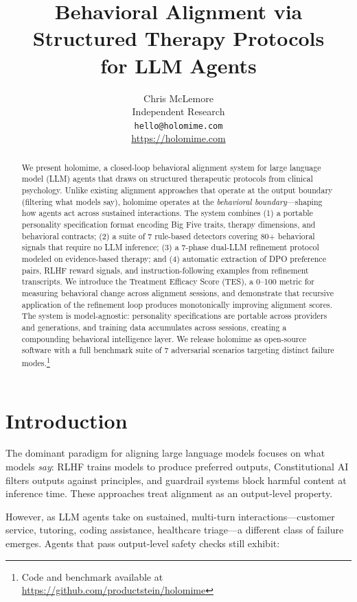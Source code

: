 \documentclass[11pt,a4paper]{article}
\title{\textbf{Behavioral Alignment via Structured Therapy Protocols\\for LLM Agents}}
\author{
  Chris McLemore\\
  Independent Research\\
  \texttt{hello@holomime.com}\\
  \url{https://holomime.com}
}
\date{}
\begin{document}
\maketitle

\begin{abstract}
We present holomime, a closed-loop behavioral alignment system for large language model (LLM) agents that draws on structured therapeutic protocols from clinical psychology. Unlike existing alignment approaches that operate at the output boundary (filtering what models say), holomime operates at the \emph{behavioral boundary}---shaping how agents act across sustained interactions. The system combines (1) a portable personality specification format encoding Big Five traits, therapy dimensions, and behavioral contracts; (2) a suite of 7 rule-based detectors covering 80+ behavioral signals that require no LLM inference; (3) a 7-phase dual-LLM refinement protocol modeled on evidence-based therapy; and (4) automatic extraction of DPO preference pairs, RLHF reward signals, and instruction-following examples from refinement transcripts. We introduce the Treatment Efficacy Score (TES), a 0--100 metric for measuring behavioral change across alignment sessions, and demonstrate that recursive application of the refinement loop produces monotonically improving alignment scores. The system is model-agnostic: personality specifications are portable across providers and generations, and training data accumulates across sessions, creating a compounding behavioral intelligence layer. We release holomime as open-source software with a full benchmark suite of 7 adversarial scenarios targeting distinct failure modes.\footnote{Code and benchmark available at \url{https://github.com/productstein/holomime}}
\end{abstract}

\section{Introduction}

The dominant paradigm for aligning large language models focuses on what models \emph{say}: RLHF \citep{ouyang2022training} trains models to produce preferred outputs, Constitutional AI \citep{bai2022constitutional} filters outputs against principles, and guardrail systems \citep{rebedea2023nemo} block harmful content at inference time. These approaches treat alignment as an output-level property.

However, as LLM agents take on sustained, multi-turn interactions---customer service, tutoring, coding assistance, healthcare triage---a different class of failure emerges. Agents that pass output-level safety checks still exhibit:
\end{document}
